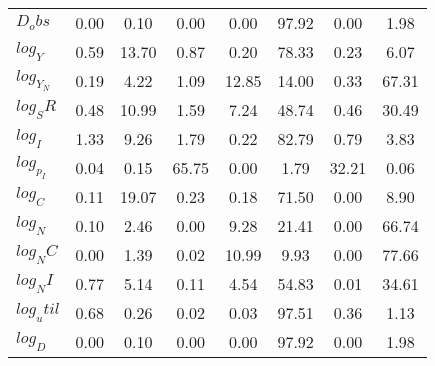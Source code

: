 \begin{center}
\begin{longtable}{lccccccc}
$D_obs     $	 & 	        0.00	 & 	        0.10	 & 	        0.00	 & 	        0.00	 & 	       97.92	 & 	        0.00	 & 	        1.98 \\ 
$log_Y     $	 & 	        0.59	 & 	       13.70	 & 	        0.87	 & 	        0.20	 & 	       78.33	 & 	        0.23	 & 	        6.07 \\ 
$log_Y_N   $	 & 	        0.19	 & 	        4.22	 & 	        1.09	 & 	       12.85	 & 	       14.00	 & 	        0.33	 & 	       67.31 \\ 
$log_SR    $	 & 	        0.48	 & 	       10.99	 & 	        1.59	 & 	        7.24	 & 	       48.74	 & 	        0.46	 & 	       30.49 \\ 
$log_I     $	 & 	        1.33	 & 	        9.26	 & 	        1.79	 & 	        0.22	 & 	       82.79	 & 	        0.79	 & 	        3.83 \\ 
$log_p_I   $	 & 	        0.04	 & 	        0.15	 & 	       65.75	 & 	        0.00	 & 	        1.79	 & 	       32.21	 & 	        0.06 \\ 
$log_C     $	 & 	        0.11	 & 	       19.07	 & 	        0.23	 & 	        0.18	 & 	       71.50	 & 	        0.00	 & 	        8.90 \\ 
$log_N     $	 & 	        0.10	 & 	        2.46	 & 	        0.00	 & 	        9.28	 & 	       21.41	 & 	        0.00	 & 	       66.74 \\ 
$log_NC    $	 & 	        0.00	 & 	        1.39	 & 	        0.02	 & 	       10.99	 & 	        9.93	 & 	        0.00	 & 	       77.66 \\ 
$log_NI    $	 & 	        0.77	 & 	        5.14	 & 	        0.11	 & 	        4.54	 & 	       54.83	 & 	        0.01	 & 	       34.61 \\ 
$log_util  $	 & 	        0.68	 & 	        0.26	 & 	        0.02	 & 	        0.03	 & 	       97.51	 & 	        0.36	 & 	        1.13 \\ 
$log_D     $	 & 	        0.00	 & 	        0.10	 & 	        0.00	 & 	        0.00	 & 	       97.92	 & 	        0.00	 & 	        1.98 \\ 
\end{longtable}
 \end{center}

